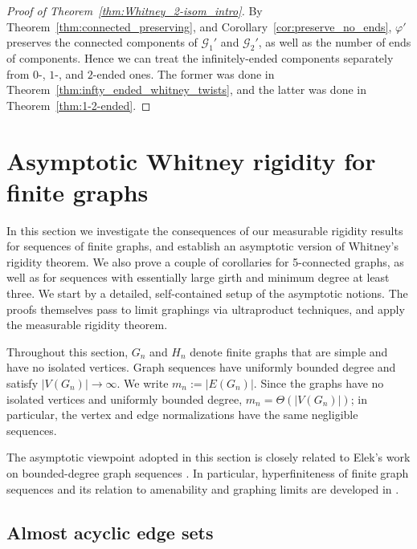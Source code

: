 \documentclass{article}
\theoremstyle{plain}
\theoremstyle{definition}
\newcommand{\cG}{\mathcal{G}}
\begin{document}
\begin{proof}[Proof of Theorem~\ref{thm:Whitney_2-isom_intro}]
    By Theorem~\ref{thm:connected_preserving}, and Corollary~\ref{cor:preserve_no_ends}, $\varphi'$ preserves the connected components of $\cG_1'$ and $\cG_2'$, as well as the number of ends of components. Hence we can treat the infinitely-ended components separately from $0$-, $1$-, and $2$-ended ones. The former was done in Theorem~\ref{thm:infty_ended_whitney_twists}, and the latter was done in Theorem~\ref{thm:1-2-ended}.
\end{proof}


\section{Asymptotic Whitney rigidity for finite graphs}\label{sec:finite-applications}
In this section we investigate the consequences of our measurable rigidity results for sequences of finite graphs, and establish an asymptotic version of Whitney’s rigidity theorem. We also prove a couple of corollaries for 5-connected graphs, as well as for sequences with essentially large girth and minimum degree at least three. We start by a detailed, self-contained setup of the asymptotic notions. The proofs themselves pass to limit graphings via ultraproduct techniques, and apply the measurable rigidity theorem. 

Throughout this section, $G_n$ and $H_n$ denote finite graphs that are simple and have no isolated vertices. Graph sequences have uniformly bounded degree and satisfy $|V(G_n)|\to\infty$. We write $m_n:=|E(G_n)|$. Since the graphs have no isolated vertices and uniformly bounded degree, $m_n=\Theta(|V(G_n)|)$; in particular, the vertex and edge normalizations have the same negligible sequences.

The asymptotic viewpoint adopted in this section is closely related to
Elek's work on bounded-degree graph sequences \cite{elek2007combinatorial, elek2012finite}. In particular, hyperfiniteness of finite graph sequences and its
relation to amenability and graphing limits are developed in \cite{elek2012finite}.

\subsection{Almost acyclic edge sets}
\end{document}
